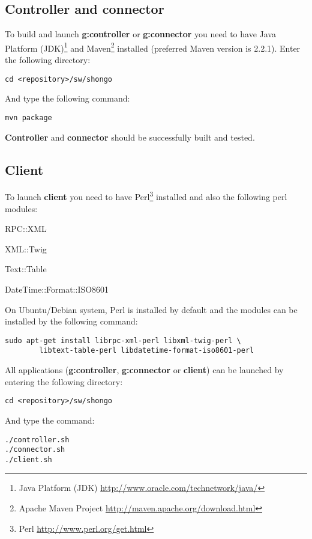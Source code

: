 \subsection{Controller and connector}
To build and launch \textbf{\gls{g:controller}} or \textbf{\gls{g:connector}} you need to have Java Platform (JDK)\footnote{Java Platform (JDK) \url{http://www.oracle.com/technetwork/java/}} and Maven\footnote{Apache Maven Project \url{http://maven.apache.org/download.html}} installed (preferred Maven version is 2.2.1). Enter the following directory:
\begin{verbatim}
cd <repository>/sw/shongo
\end{verbatim}
And type the following command:
\begin{verbatim}
mvn package
\end{verbatim}
\textbf{Controller} and \textbf{connector} should be successfully built and tested. 

\subsection{Client}
To launch \textbf{client} you need to have Perl\footnote{Perl \url{http://www.perl.org/get.html}} installed and also the following perl modules:
\begin{compactenum}
\item RPC::XML
\item XML::Twig
\item Text::Table
\item DateTime::Format::ISO8601
\end{compactenum}
On Ubuntu/Debian system, Perl is installed by default and the modules
can be installed by the following command:
\begin{verbatim}
sudo apt-get install librpc-xml-perl libxml-twig-perl \
        libtext-table-perl libdatetime-format-iso8601-perl
\end{verbatim}
All applications (\textbf{\gls{g:controller}}, \textbf{\gls{g:connector}} or \textbf{client}) can be launched by entering the following directory:
\begin{verbatim}
cd <repository>/sw/shongo
\end{verbatim}
And type the  command:
\begin{verbatim}
./controller.sh
./connector.sh
./client.sh
\end{verbatim}

